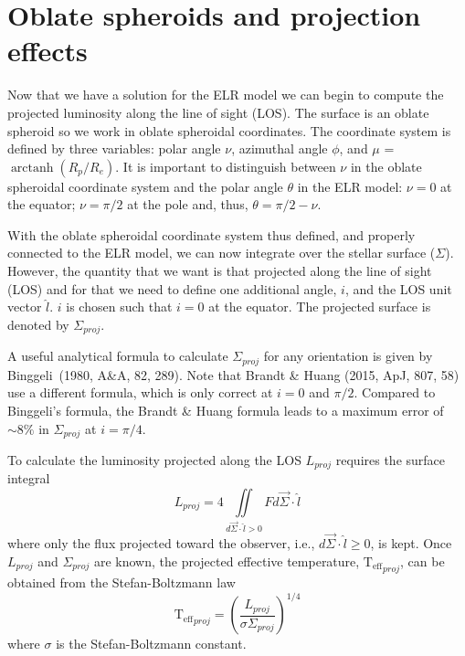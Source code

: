 \documentclass[12pt]{article}
\DeclareMathOperator{\arctanh}{arctanh}
\newcommand{\Teff}{\mathrm{T_{eff}}}
\begin{document}
\section{Oblate spheroids and projection effects}
Now that we have a solution for the ELR model we can begin to
compute the projected luminosity along the line of sight (LOS). The surface is
an oblate spheroid so we work in oblate spheroidal coordinates. The coordinate
system is defined by three variables: polar angle $\nu$, azimuthal angle
$\phi$, and $\mu$ = $\arctanh( R_p /R_e )$. It is important to distinguish
between $\nu$ in the oblate spheroidal coordinate system and the polar angle
$\theta$ in the ELR model: $\nu = 0$ at the equator; $\nu = \pi/2$ at the pole
and, thus, $\theta = \pi/2 - \nu$.

With the oblate spheroidal coordinate system thus defined, and properly
connected to the ELR model, we can now integrate over the stellar surface
($\Sigma$). However, the quantity that we want is that projected along the line
of sight (LOS) and for that we need to define one additional angle, $i$, and the
LOS unit vector $\hat{l}$. $i$ is chosen such that $i = 0$ at the equator.
The projected surface is denoted by $\Sigma_{proj}$.

A useful analytical formula to calculate $\Sigma_{proj}$ for any orientation is given by
Binggeli~(1980, A\&A, 82, 289). Note that Brandt \& Huang (2015, ApJ, 807, 58) use a different formula,
which is only correct at $i = 0$ and $\pi/2$. Compared to Binggeli's formula, the Brandt \& Huang
formula leads to a maximum error of $\sim8\%$ in $\Sigma_{proj}$ at $i = \pi/4$.

To calculate the luminosity projected along the LOS $L_{proj}$ requires the
surface integral
\begin{equation}
  L_{proj} = 4 \iint \limits_{d\vec{\Sigma} \cdot \hat{l} > 0} F d\vec{\Sigma} \cdot \hat{l}
\end{equation}
where only the flux projected toward the observer, i.e., $d\vec{\Sigma} \cdot \hat{l} \geq 0$, is kept. Once $L_{proj}$ and $\Sigma_{proj}$ are known, the projected effective temperature, $\Teff_{proj}$, can be obtained from the Stefan-Boltzmann law
\begin{equation}
\Teff_{proj} = \left( \frac{L_{proj}}{\sigma \Sigma_{proj}} \right)^{1/4}
\end{equation}
where $\sigma$ is the Stefan-Boltzmann constant.
\end{document}
